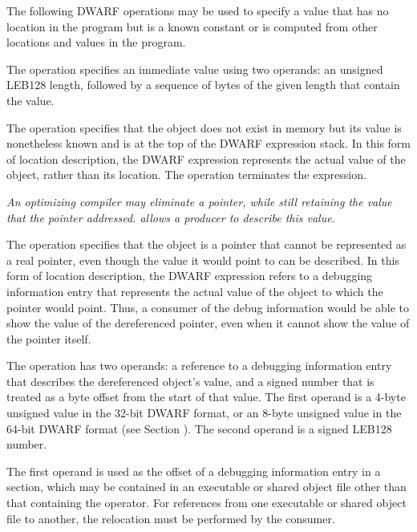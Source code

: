 The following DWARF operations may be used to specify a value
that has no location in the program but is a known constant
or is computed from other locations and values in the program.
\begin{enumerate}[1. ]
\itembfnl{\DWOPimplicitvalueTARG}
The \DWOPimplicitvalueNAME{} operation specifies an immediate value
using two operands: an unsigned LEB128
length, followed by a 
\bb
sequence of bytes of the given length that contain the value.
\eb

\itembfnl{\DWOPstackvalueTARG}
The \DWOPstackvalueNAME{} 
operation specifies that the object
does not exist in memory but its value is nonetheless known
and is at the top of the DWARF expression stack. In this form
of location description, the DWARF expression represents the
actual value of the object, rather than its location. The
\DWOPstackvalueNAME{} operation terminates the expression.

\itembfnl{\DWOPimplicitpointerTARG}
\bb
\textit{An optimizing compiler may eliminate a pointer, while
still retaining the value that the pointer addressed.  
\DWOPimplicitpointerNAME{} allows a producer to describe this value.}
\eb

The \DWOPimplicitpointerNAME{} operation specifies that the object
is a pointer that cannot be represented as a real pointer,
even though the value it would point to can be described. In
this form of location description, the DWARF expression refers
to a debugging information entry that represents the actual
value of the object to which the pointer would point. Thus, a
consumer of the debug information would be able to show the
value of the dereferenced pointer, even when it cannot show
the value of the pointer itself.

The \DWOPimplicitpointerNAME{} operation has two operands: a 
reference to a debugging information entry that describes 
the dereferenced object's value, and a signed number that 
is treated as a byte offset from the start of that value. 
The first operand is a 4-byte unsigned value in the 32-bit 
DWARF format, or an 8-byte unsigned value in the 64-bit 
DWARF format (see Section 
).
The second operand is a 
signed LEB128 number.

The first operand is used as the offset of a debugging
information entry in a \dotdebuginfo{} section, which may be
contained in an executable or shared object file other than that
containing the operator. For references from one executable or
shared object file to another, the relocation must be performed 
by the consumer.


\end{enumerate}
